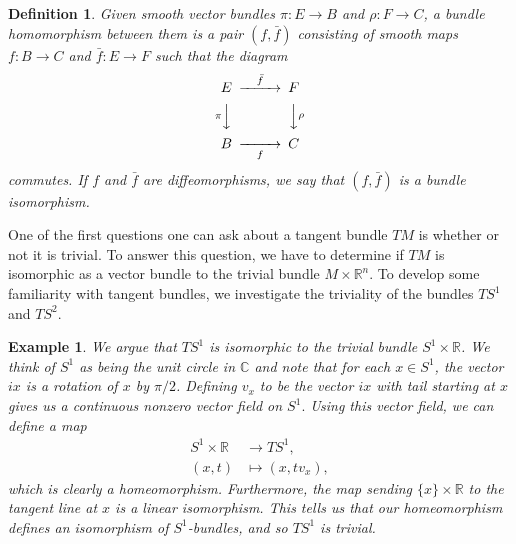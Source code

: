 \documentclass{amsart}          %
\newtheorem{definition}[theorem]{Definition}
\newtheorem{example}[theorem]{Example}
\newcommand{\R}{\mathbb R}
\newcommand{\C}{\mathbb C}
\begin{document}
\begin{definition}
	Given smooth vector bundles $\pi:E\to B$ and $\rho:F\to C$, a bundle homomorphism between them is a pair $(f,\bar{f})$ consisting of smooth maps $f:B\to C$ and $\bar{f}:E\to F$ such that the diagram
	$$
	\begin{CD}
	E @>\bar{f}>> F\\
	@V\pi VV  @VV\rho V\\
	B @>>f> C
	\end{CD}
	$$
	commutes. If $f$ and $\bar{f}$ are diffeomorphisms, we say that $(f,\bar{f})$ is a bundle isomorphism.
\end{definition}

One of the first questions one can ask about a tangent bundle $TM$ is whether or not it is trivial. To answer this question, we have to determine if $TM$ is isomorphic as a vector bundle to the trivial bundle $M\times \R^n$. To develop some familiarity with tangent bundles, we investigate the triviality of the bundles $TS^1$ and $TS^2$.
\begin{example} We argue that $TS^1$ is isomorphic to the trivial bundle $S^1\times\R$.
	We think of $S^1$ as being the unit circle in $\C$ and note that for each $x\in S^1$, the vector $ix$ is a rotation of $x$ by $\pi/2$. Defining $v_x$ to be the vector $ix$ with tail starting at $x$ gives us a continuous nonzero vector field on $S^1.$ Using this vector field, we can define a map
	\begin{align*}
	S^1\times\R&\to TS^1,\\
	(x,t)&\mapsto (x,tv_x),
 	\end{align*}
 	which is clearly a homeomorphism. Furthermore, the map sending $\{x\}\times\R$ to the tangent line at $x$ is a linear isomorphism. This tells us that our homeomorphism defines an isomorphism of $S^1$-bundles, and so $TS^1$ is trivial.
\end{example}
\end{document}

